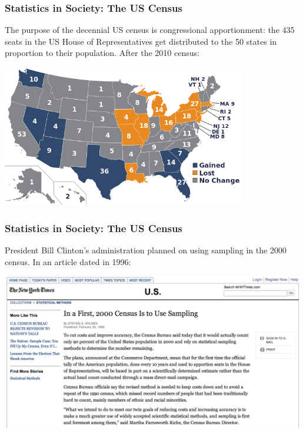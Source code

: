\documentclass[slides]{beamer}
\newcommand{\blue}[1]{\textcolor{blue2}{#1}}
\begin{document}
\begin{frame}
\frametitle{Statistics in Society:  The US Census}

The purpose of the decennial US census is \blue{congressional apportionment}: the 435 seats in the US House of Representatives get distributed to the 50 states in proportion to their population.  \pause After the 2010 census:

\begin{center}
\includegraphics[width=0.8\textwidth]{figure/apportionment.png}
\end{center}



\end{frame}


\begin{frame}
\frametitle{Statistics in Society:  The US Census}

President Bill Clinton's administration planned on using sampling in the 2000 census.  In an article dated in 1996:
\pause \begin{center}
\includegraphics[width=\textwidth]{figure/census_2000.png}
\end{center}

\end{frame}
\end{document}
